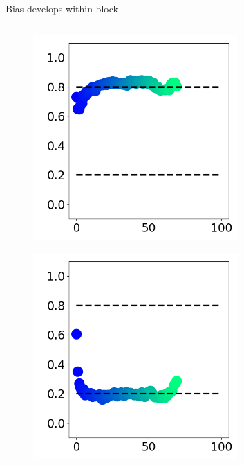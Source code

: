 \documentclass[14pt]{beamer}
\begin{document}
\begin{frame}{Bias develops within block}
\begin{columns}
\begin{column}{0.5\textwidth}
  \begin{figure}
  \includegraphics[width=0.7\textwidth]{images/ptask/time_bias1}
  \end{figure}
  \vspace{-2cm}
  \begin{figure}
    \includegraphics[width=0.7\textwidth]{images/ptask/time_bias0}
  \end{figure}

\end{column}
\end{columns}

\end{frame}
\end{document}

